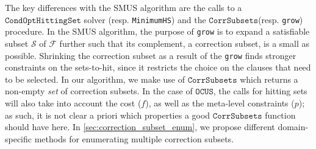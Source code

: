 \documentclass[twoside,11pt]{article}
\newcommand\m[1]{\mathcal{#1}}
\newcommand\comment[1]{\marginpar{\tiny #1}}
\renewcommand\comment[1]{#1}
\newcommand{\emilio}[1]{{\comment{\color{red}Emilio: #1}}}
\newcommand{\bart}[1]{{\comment{\color{OliveGreen}Bart: #1}}}
\newcommand\formula{\ensuremath{\m{F} }\xspace}
\newcommand\mm[1]{\ensuremath{#1}\xspace}
\newcommand\call[1]{\mm{\texttt{#1}}}
\newcommand\cohs{\mm{\call{CondOptHittingSet}}}
\newcommand\grow{\mm{\call{Grow}}}
\newcommand\comus{\mm{\call{OCUS}}}
\newcommand\corrsubsets{\mm{\call{CorrSubsets}}}
\begin{document}
The key differences with the SMUS algorithm are the calls to a \cohs solver (resp. \texttt{MinimumHS}) and the \corrsubsets (resp. \texttt{grow}) procedure.
In the SMUS algorithm, the purpose of \texttt{grow} is to expand a satisfiable subset $\m{S}$ of $\m{F}$ further such that its complement, a correction subset, is a small as possible.
Shrinking the correction subset as a result of the \texttt{grow} finds stronger constraints on the sets-to-hit, since it restricts the choice on the clauses that need to be selected. 
In our algorithm, we make use of \corrsubsets which returns a non-empty \emph{set} of correction subsets. 
In the case of \comus, the calls for hitting sets will also take into account the cost ($f$), as well as the meta-level constraints ($p$); as such, it is not clear a priori which properties a good \corrsubsets function should have here.
In \cref{sec:correction_subset_enum}, we propose different domain-specific methods for enumerating multiple correction subsets. 
\end{document}
